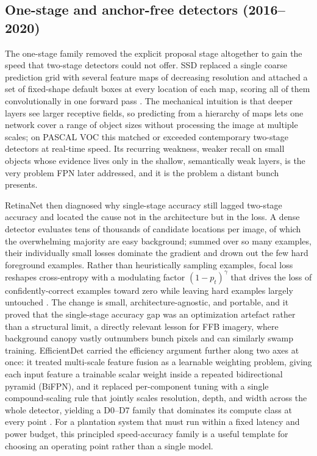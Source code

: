 \subsection{One-stage and anchor-free detectors (2016--2020)}

The one-stage family removed the explicit proposal stage altogether to gain the speed that two-stage detectors could not offer. SSD replaced a single coarse prediction grid with several feature maps of decreasing resolution and attached a set of fixed-shape default boxes at every location of each map, scoring all of them convolutionally in one forward pass \cite{liu2016ssd}. The mechanical intuition is that deeper layers see larger receptive fields, so predicting from a hierarchy of maps lets one network cover a range of object sizes without processing the image at multiple scales; on PASCAL VOC this matched or exceeded contemporary two-stage detectors at real-time speed. Its recurring weakness, weaker recall on small objects whose evidence lives only in the shallow, semantically weak layers, is the very problem FPN later addressed, and it is the problem a distant bunch presents.

RetinaNet then diagnosed why single-stage accuracy still lagged two-stage accuracy and located the cause not in the architecture but in the loss. A dense detector evaluates tens of thousands of candidate locations per image, of which the overwhelming majority are easy background; summed over so many examples, their individually small losses dominate the gradient and drown out the few hard foreground examples. Rather than heuristically sampling examples, focal loss reshapes cross-entropy with a modulating factor $(1-p_t)^\gamma$ that drives the loss of confidently-correct examples toward zero while leaving hard examples largely untouched \cite{lin2017focal}. The change is small, architecture-agnostic, and portable, and it proved that the single-stage accuracy gap was an optimization artefact rather than a structural limit, a directly relevant lesson for FFB imagery, where background canopy vastly outnumbers bunch pixels and can similarly swamp training. EfficientDet carried the efficiency argument further along two axes at once: it treated multi-scale feature fusion as a learnable weighting problem, giving each input feature a trainable scalar weight inside a repeated bidirectional pyramid (BiFPN), and it replaced per-component tuning with a single compound-scaling rule that jointly scales resolution, depth, and width across the whole detector, yielding a D0--D7 family that dominates its compute class at every point \cite{tan2020efficientdet}. For a plantation system that must run within a fixed latency and power budget, this principled speed-accuracy family is a useful template for choosing an operating point rather than a single model.

